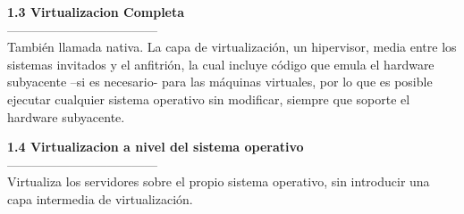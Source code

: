 \documentclass[twoside,twocolumn]{article}
\begin{document}
\begin{flushright}
\begin{itemize}
\textbf{1.3  Virtualizacion Completa }\\
------------------------------------
\textbf{}\\ 
También llamada nativa. La capa de virtualización, un
hipervisor, media entre los sistemas invitados y el anfitrión, la cual incluye
código que emula el hardware subyacente –si es necesario- para las máquinas
virtuales, por lo que es posible ejecutar cualquier sistema operativo sin
modificar, siempre que soporte el hardware subyacente.

\textbf{1.4  Virtualizacion a nivel del sistema operativo }\\
------------------------------------
\textbf{}\\
Virtualiza los servidores sobre el
propio sistema operativo, sin introducir una capa intermedia de virtualización.


\end{itemize}
\end{flushright}
\end{document}
